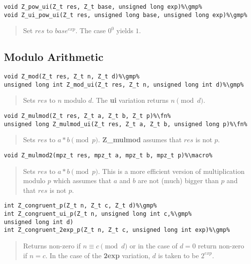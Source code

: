 \documentclass[a4paper,10pt]{article}
\newcommand{\fn}{\hfill[Function]}
\newcommand{\macro}{\hfill[Macro]}
\newcommand{\gmp}{\hfill[GMP]}
\begin{document}
\begin{lstlisting}
void Z_pow_ui(Z_t res, Z_t base, unsigned long exp)%\gmp%
void Z_ui_pow_ui(Z_t res, unsigned long base, unsigned long exp)%\gmp%
\end{lstlisting}
\begin{quote}Set $res$ to $base^{exp}$. The case $0^0$ yields $1$.\end{quote}

\subsection{Modulo Arithmetic}
\begin{lstlisting}
void Z_mod(Z_t res, Z_t n, Z_t d)%\gmp%
unsigned long int Z_mod_ui(Z_t res, Z_t n, unsigned long int d)%\gmp%
\end{lstlisting}
\begin{quote}Sets $res$ to $n$ modulo $d$. The \textbf{ui} variation returns $n \pmod{d}$.\end{quote}

\begin{lstlisting}
void Z_mulmod(Z_t res, Z_t a, Z_t b, Z_t p)%\fn%
unsigned long Z_mulmod_ui(Z_t res, Z_t a, Z_t b, unsigned long p)%\fn%
\end{lstlisting}
\begin{quote}Sets $res$ to $a*b \pmod{p}$. \textbf{Z\_mulmod} assumes that $res$ is not $p$.\end{quote}

\begin{lstlisting}
void Z_mulmod2(mpz_t res, mpz_t a, mpz_t b, mpz_t p)%\macro%
\end{lstlisting}
\begin{quote}Sets $res$ to $a*b \pmod{p}$. This is a more efficient version of multiplication modulo $p$ which assumes that $a$ and $b$ are not (much) bigger than $p$ and that $res$ is not $p$.\end{quote}

\begin{lstlisting}
int Z_congruent_p(Z_t n, Z_t c, Z_t d)%\gmp%
int Z_congruent_ui_p(Z_t n, unsigned long int c,%\gmp%
unsigned long int d)
int Z_congruent_2exp_p(Z_t n, Z_t c, unsigned long int exp)%\gmp%
\end{lstlisting}
\begin{quote}Returns non-zero if $n \equiv c \pmod{d}$ or in the case of $d = 0$ return non-zero if $n = c$. In the case of the \textbf{2exp} variation, $d$ is taken to be $2^{exp}$.\end{quote}
\end{document}
